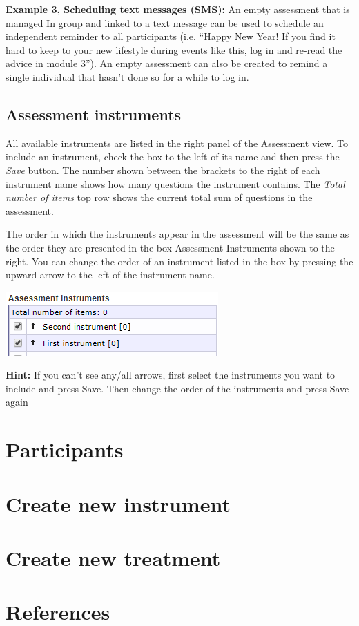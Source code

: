\documentclass[]{book}
\begin{document}
\textbf{Example 3, Scheduling text messages (SMS):} An empty assessment that is managed In group and linked to a text message can be used to schedule an independent reminder to all participants (i.e. ``Happy New Year! If you find it hard to keep to your new lifestyle during events like this, log in and re-read the advice in module 3''). An empty assessment can also be created to remind a single individual that hasn't done so for a while to log in.

\hypertarget{assessment-instruments}{%
\section{Assessment instruments}\label{assessment-instruments}}

All available instruments are listed in the right panel of the Assessment view. To include an instrument, check the box to the left of its name and then press the \emph{Save} button. The number shown between the brackets to the right of each instrument name shows how many questions the instrument contains. The \emph{Total number of items} top row shows the current total sum of questions in the assessment.

The order in which the instruments appear in the assessment will be the same as the order they are presented in the box Assessment Instruments shown to the right. You can change the order of an instrument listed in the box by pressing the upward arrow to the left of the instrument name.

\includegraphics{images/assessment-instrument.png}

\textbf{Hint:} If you can't see any/all arrows, first select the instruments you want to include and press Save. Then change the order of the instruments and press Save again

\hypertarget{participants}{%
\chapter{Participants}\label{participants}}

\hypertarget{create-new-instrument}{%
\chapter{Create new instrument}\label{create-new-instrument}}

\hypertarget{create-new-treatment}{%
\chapter{Create new treatment}\label{create-new-treatment}}

\hypertarget{references}{%
\chapter{References}\label{references}}


\end{document}
